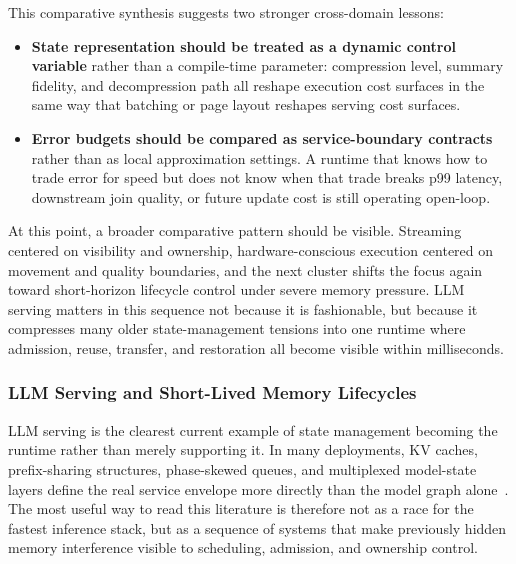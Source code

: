 \documentclass[acmsmall,screen,review]{acmart}
\begin{document}
This comparative synthesis suggests two stronger cross-domain lessons:
\begin{itemize}[leftmargin=*]
\item \textbf{State representation should be treated as a dynamic control variable} rather than a compile-time parameter: compression level, summary fidelity, and decompression path all reshape execution cost surfaces in the same way that batching or page layout reshapes serving cost surfaces.
\item \textbf{Error budgets should be compared as service-boundary contracts} rather than as local approximation settings. A runtime that knows how to trade error for speed but does not know when that trade breaks p99 latency, downstream join quality, or future update cost is still operating open-loop.
\end{itemize}

At this point, a broader comparative pattern should be visible. Streaming centered on visibility and ownership, hardware-conscious execution centered on movement and quality boundaries, and the next cluster shifts the focus again toward short-horizon lifecycle control under severe memory pressure. LLM serving matters in this sequence not because it is fashionable, but because it compresses many older state-management tensions into one runtime where admission, reuse, transfer, and restoration all become visible within milliseconds.

\subsubsection{LLM Serving and Short-Lived Memory Lifecycles}

LLM serving is the clearest current example of state management becoming the runtime rather than merely supporting it. In many deployments, KV caches, prefix-sharing structures, phase-skewed queues, and multiplexed model-state layers define the real service envelope more directly than the model graph alone~\cite{kwon2023pagedattention,agrawal2024sarathi,li2023alpaserve,chen2024punica}. The most useful way to read this literature is therefore not as a race for the fastest inference stack, but as a sequence of systems that make previously hidden memory interference visible to scheduling, admission, and ownership control.
\end{document}
